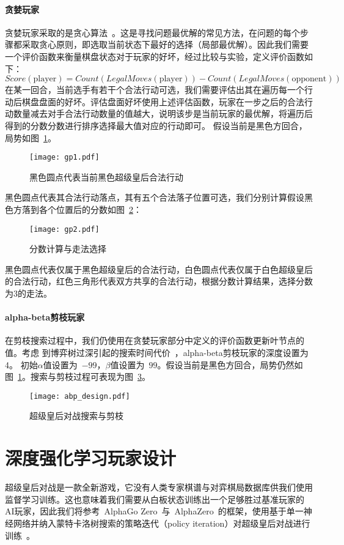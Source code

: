 \paragraph{贪婪玩家}
贪婪玩家采取的是贪心算法~\cite{introAlgo}。这是寻找问题最优解的常见方法，在问题的每个步骤都采取贪心原则，即选取当前状态下最好的选择（局部最优解）。因此我们需要一个评价函数来衡量棋盘状态对于玩家的好坏，经过比较与实验，定义评价函数如下：
\begin{equation}
    Score(\text{player}) = Count(LegalMoves(\text{player})) - Count(LegalMoves(\text{opponent}))
\end{equation}
在某一回合，当前选手有若干个合法行动可选，我们需要评估出其在遍历每一个行动后棋盘盘面的好坏。评估盘面好坏使用上述评估函数，玩家在一步之后的合法行动数量减去对手合法行动数量的值越大，说明该步是当前玩家的最优解，将遍历后得到的分数分数进行排序选择最大值对应的行动即可。
假设当前是黑色方回合，局势如图~\ref{fig:gp1}。
\begin{figure}[htb]
    \centering
    \texttt{[image: gp1.pdf]}
    \caption[gp1]{%
        黑色圆点代表当前黑色超级皇后合法行动%
      }
    \label{fig:gp1}
\end{figure}
黑色圆点代表其合法行动落点，其有五个合法落子位置可选，我们分别计算假设黑色方落到各个位置后的分数如图~\ref{fig:gp2}：
\begin{figure}[htb]
    \centering
    \texttt{[image: gp2.pdf]}
    \caption[gp2]{%
        分数计算与走法选择%
      }
    \label{fig:gp2}
\end{figure}
黑色圆点代表仅属于黑色超级皇后的合法行动，白色圆点代表仅属于白色超级皇后的合法行动，红色三角形代表双方共享的合法行动，根据分数计算结果，选择分数为3的走法。
\paragraph{alpha-beta剪枝玩家}
在剪枝搜索过程中，我们仍使用在贪婪玩家部分中定义的评价函数更新叶节点的值。考虑
到博弈树过深引起的搜索时间代价~\cite{sstextbook}，alpha-beta剪枝玩家的深度设置为4。
初始$\alpha$值设置为~$-99$，$\beta$值设置为~$99$。假设当前是黑色方回合，局势仍然如图~\ref{fig:gp1}。搜索与剪枝过程可表现为图~\ref{fig:abpde}。
\begin{figure}[htb]
    \centering
    \texttt{[image: abp\_design.pdf]}
    \caption[abpde]{%
        超级皇后对战搜索与剪枝%
      }
    \label{fig:abpde}
\end{figure}

\section{深度强化学习玩家设计}
超级皇后对战是一款全新游戏，它没有人类专家棋谱与对弈棋局数据库供我们使用监督学习训练。这也意味着我们需要从白板状态训练出一个足够胜过基准玩家的AI玩家，因此我们将参考~AlphaGo Zero~与~AlphaZero~的框架，使用基于单一神经网络并纳入蒙特卡洛树搜索的策略迭代（policy iteration）对超级皇后对战进行训练~\cite{Silver1140,Silver2017,Silver2016}。

